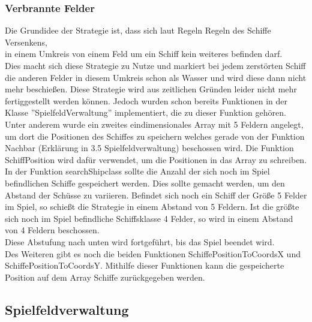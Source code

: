 \newpage

\subsubsection{Verbrannte Felder}

Die Grundidee der Strategie ist, dass sich laut Regeln Regeln des Schiffe Versenkens, \\in einem Umkreis von einem Feld um ein Schiff kein weiteres befinden 
darf. \\Dies macht sich diese Strategie zu Nutze und markiert bei jedem zerstörten Schiff die anderen Felder in diesem Umkreis schon als Wasser und wird diese dann 
nicht mehr beschießen. Diese Strategie wird aus zeitlichen Gründen leider nicht mehr fertiggestellt werden können. Jedoch wurden schon bereits Funktionen in der 
\\Klasse ''SpielfeldVerwaltung'' implementiert, die zu dieser Funktion gehören. \\Unter anderem wurde ein zweites eindimensionales Array mit 5 Feldern angelegt, \\um dort 
die Positionen des Schiffes zu speichern welches gerade von der Funktion \\Nachbar (Erklärung in 3.5 Spielfeldverwaltung) beschossen wird. Die Funktion SchiffPosition wird dafür verwendet, um die 
Positionen in das Array zu schreiben. \\In der Funktion searchShipclass sollte die Anzahl der sich noch im Spiel befindlichen Schiffe gespeichert werden. Dies 
sollte gemacht werden, um den Abstand der Schüsse zu variieren. Befindet sich noch ein Schiff der Größe 5 Felder im Spiel, so schießt die Strategie in einem 
Abstand von 5 Feldern. Ist die größte sich noch im Spiel befindliche Schiffsklasse 4 Felder, so wird in einem Abstand von 4 Feldern beschossen. \\Diese Abstufung nach 
unten wird fortgeführt, bis das Spiel beendet wird. \\Des Weiteren gibt es noch die beiden Funktionen SchiffePositionToCoordsX und SchiffePositionToCoordsY. Mithilfe dieser Funktionen kann die gespeicherte Position auf dem Array Schiffe zurückgegeben werden.

\subsection{Spielfeldverwaltung}

